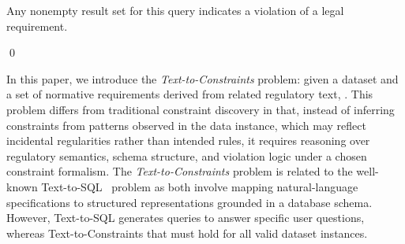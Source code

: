 \begin{example}
Any nonempty result set for this query indicates a violation of a legal requirement. \DIFaddbegin {}\DIFaddend {}

\qed
\end{example}




In this paper, we introduce the \emph{Text-to-Constraints} problem: given a dataset and a set of normative requirements derived from related regulatory text, .  This problem differs from traditional constraint discovery in that, instead of inferring constraints from patterns observed in the data instance, which may reflect incidental regularities rather than intended rules, it requires reasoning over regulatory semantics, schema structure, and violation logic under a chosen constraint formalism. The \emph{Text-to-Constraints} problem is related to the well-known Text-to-SQL~\cite{llmTEXT2SQLSurvey2025} problem as both involve mapping natural-language specifications to structured representations grounded in a database schema. However, Text-to-SQL generates queries to answer specific user questions,  whereas Text-to-Constraints  that must hold for all valid dataset instances.  %


